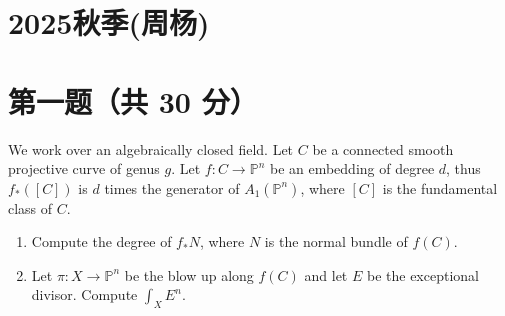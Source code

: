 
\section{2025秋季(周杨)}

\section*{第一题（共 30 分）}
We work over an algebraically closed field. Let $C$ be a connected smooth
projective curve of genus $g$. Let $f : C \to \mathbb{P}^n$ be an embedding of degree $d$,
thus $f_*([C])$ is $d$ times the generator of $A_1(\mathbb{P}^n)$, where $[C]$ is the fundamental
class of $C$.
\begin{enumerate}[label=\arabic*.]
\item Compute the degree of $f_*N$, where $N$ is the normal bundle of $f(C)$.
\item Let $\pi : X \to \mathbb{P}^n$ be the blow up along $f(C)$ and let $E$ be the exceptional
divisor. Compute $\int_X E^n$.
\end{enumerate}

